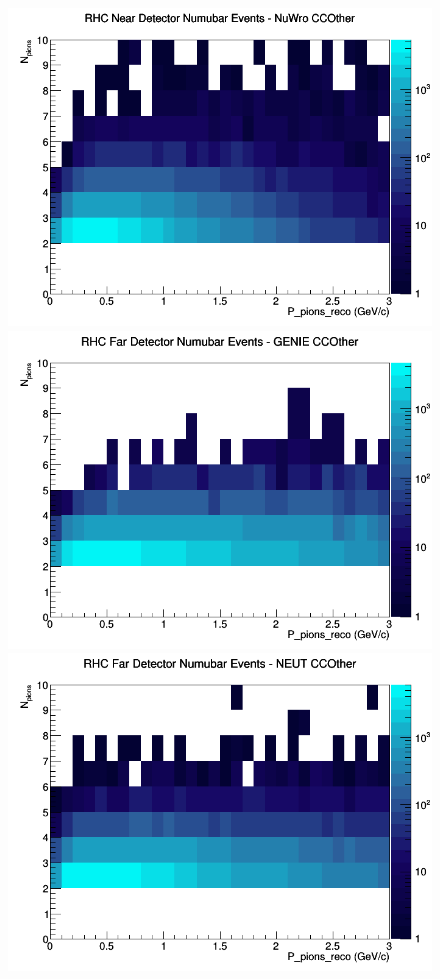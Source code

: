 \documentclass[12pt]{article}
\begin{document}
\begin{figure}[h]
\includegraphics[width=\linewidth]{eff_N_P/FGT/pions/CCOther_RHC_ND_numubar_N_P_NuWro.png}
\endminipage
\newline
{}
\includegraphics[width=\linewidth]{eff_N_P/FGT/pions/CCOther_RHC_FD_numubar_N_P_GENIE.png}
\endminipage
{}
\includegraphics[width=\linewidth]{eff_N_P/FGT/pions/CCOther_RHC_FD_numubar_N_P_NEUT.png}

\end{figure}
\end{document}
